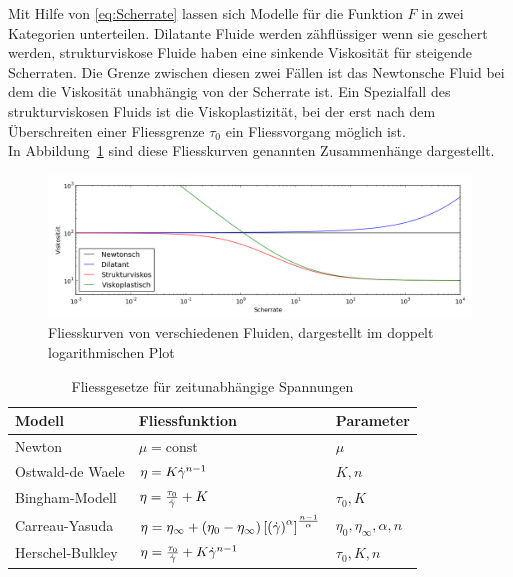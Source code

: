 Mit Hilfe von \eqref{eq:Scherrate} lassen sich Modelle für die Funktion $F$ in zwei Kategorien unterteilen. Dilatante Fluide werden zähflüssiger wenn sie geschert werden, strukturviskose Fluide haben eine sinkende Viskosität für steigende Scherraten. 
Die Grenze zwischen diesen zwei Fällen ist das Newtonsche Fluid bei dem die Viskosität unabhängig von der Scherrate ist. 
Ein Spezialfall des strukturviskosen Fluids ist die Viskoplastizität, bei der erst nach dem Überschreiten einer Fliessgrenze $\tau_0$ ein Fliessvorgang möglich ist.\\
In Abbildung~\ref{fig:fliessKurven} sind diese Fliesskurven genannten Zusammenhänge dargestellt.
%
\begin{figure}
    \centering
    \includegraphics[width=\textwidth]{figures/Fliesskurven.png}
    \caption{Fliesskurven von verschiedenen Fluiden, dargestellt im doppelt logarithmischen Plot}
    \label{fig:fliessKurven}
\end{figure}
%
\begin{table}
    \centering
    \begin{tabular}{l l l}
        Modell & Fliessfunktion & Parameter \\
        \hline
        Newton & $\mu= \mbox{const}$ & $\mu$ \\ 
        Ostwald-de Waele & $\eta=K \dot\gamma^{n-1}$ & $K,n$ \\ 
        Bingham-Modell & $\eta= \frac{\tau_0}{\dot\gamma}+K $ & $\tau_0,K$ \\ 
        Carreau-Yasuda & $\eta=\eta_\infty+\left( \eta_0-\eta_\infty \right)\left[ \left( \dot\gamma \right)^\alpha \right] ^{\frac{n-1}{\alpha}} $ & $\eta_0,\eta_\infty,\alpha,n$ \\ 
        Herschel-Bulkley & $\eta= \frac{\tau_0}{\dot\gamma}+K\dot\gamma^{n-1} $ & $\tau_0,K,n$
    \end{tabular}
    \caption{Fliessgesetze für zeitunabhängige Spannungen}
    \label{tab:Fliessgesetze}
\end{table}
%

